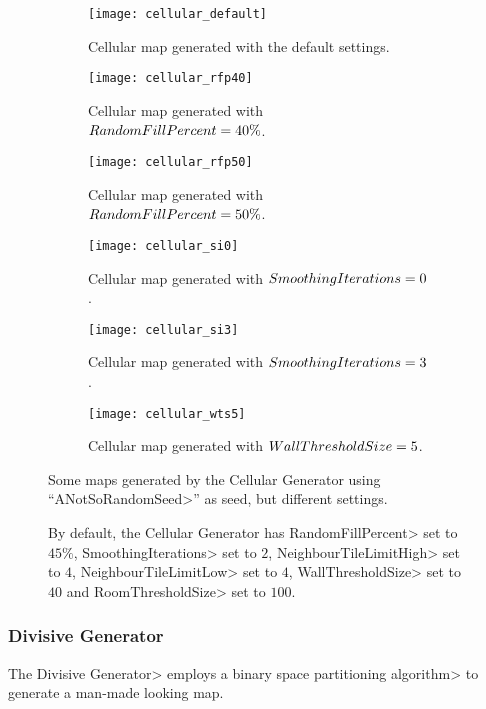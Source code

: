 \begin{figure}[tp]
	\centering
  	\begin{subfigure}[t]{0.325\linewidth}
		\texttt{[image: cellular\_default]}
     		\caption{Cellular map generated with the default settings.}
 	\end{subfigure}
  	\begin{subfigure}[t]{0.325\linewidth}
    		\texttt{[image: cellular\_rfp40]}
    		\caption{Cellular map generated with $Ran\-dom\-Fill\-Per\-cent = 40\%$.}
  	\end{subfigure}
  	\begin{subfigure}[t]{0.325\linewidth}
    		\texttt{[image: cellular\_rfp50]}
    		\caption{Cellular map generated with $Ran\-dom\-Fill\-Per\-cent = 50\%$.}
  	\end{subfigure}
  	\begin{subfigure}[t]{0.325\linewidth}
		\texttt{[image: cellular\_si0]}
     		\caption{Cellular map generated with $Smooth\-ing\-It\-er\-a\-tions = 0$.}
 	\end{subfigure}
  	\begin{subfigure}[t]{0.325\linewidth}
    		\texttt{[image: cellular\_si3]}
     		\caption{Cellular map generated with $Smooth\-ing\-It\-er\-a\-tions = 3$.}
  	\end{subfigure}
  	\begin{subfigure}[t]{0.325\linewidth}
    		\texttt{[image: cellular\_wts5]}
     		\caption{Cellular map generated with $Wall\-Thresh\-old\-Size = 5$.}
  	\end{subfigure}	
	\caption{Some maps generated by the Cellular Generator using ``\<ANotSoRandomSeed>'' as seed, but different settings.}
	\caption*{By default, the Cellular Generator has \<RandomFillPercent> set to $45\%$, \<SmoothingIterations> set to $2$,  \<NeighbourTileLimitHigh> set to $4$,  \<NeighbourTileLimitLow> set to $4$,  \<WallThresholdSize> set to $40$ and \<RoomThresholdSize> set to $100$.}
	\label{fig:cellulars}
\end{figure}


\subsubsection{Divisive Generator}

The \<Divisive Generator> employs a \<binary space partitioning algorithm> to generate a man-made looking map.

